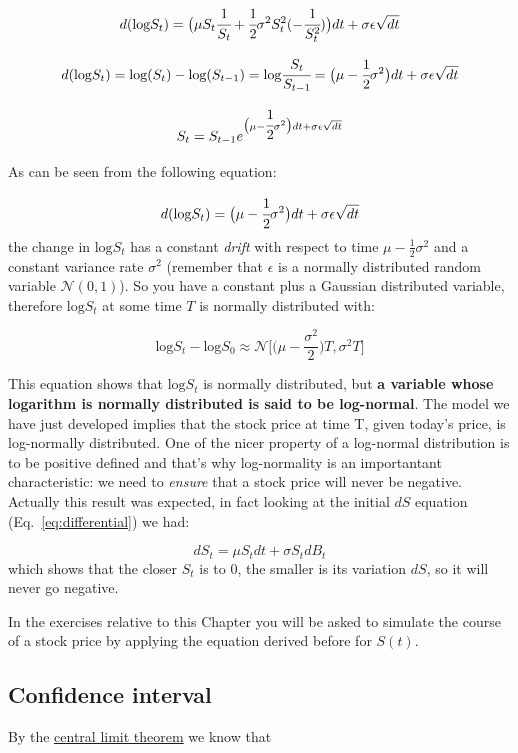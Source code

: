 \[d(\textrm{log} S_t) = \big(\mu S_t \cfrac{1}{S_t} + \cfrac{1}{2}\sigma^2 S_t^2 (-\cfrac{1}{S_t^2})\big)dt + \sigma\epsilon\sqrt{dt}\]

\[d(\textrm{log} S_t) = \textrm{log} (S_t) - \textrm{log} (S_{t-1}) = \textrm{log} \cfrac{S_t}{S_{t-1}} = \big(\mu - \cfrac{1}{2}\sigma^2\big)dt + \sigma\epsilon\sqrt{dt}\]

\[S_t = S_{t-1}e^{\big(\mu - \cfrac{1}{2}\sigma^2\big)dt + \sigma\epsilon\sqrt{dt}}\]

    As can be seen from the following equation:

\[d(\textrm{log} S_t) = \big(\mu - \cfrac{1}{2}\sigma^2\big)dt + \sigma\epsilon\sqrt{dt}\]
the change in \(\textrm{log} S_t\) has a constant \emph{drift} with respect to time 
\(\mu - \frac{1}{2}\sigma^2\) and a constant variance rate \(\sigma^2\)
(remember that \(\epsilon\) is a normally distributed random variable
\(\mathcal{N}(0,1)\)). So you have a constant plus a Gaussian
distributed variable, therefore \(\textrm{log} S_t\) at some time \(T\)
is normally distributed with:

\[\textrm{log}S_t - \textrm{log}S_0 \approx\mathcal{N}\big[\big(\mu-\frac{\sigma^2}{2}\big)T, \sigma^2 T\big]\]

This equation shows that \(\textrm{log}S_t\) is normally distributed,
but \textbf{a variable whose logarithm is normally distributed is said
to be log-normal}. The model we have just developed implies that
the stock price at time T, given today's price, is log-normally
distributed. One of the nicer property of a log-normal distribution is to be positive defined and that's why log-normality is an importantant characteristic: we need to \emph{ensure} that a stock price will never be negative. Actually this result was expected, in fact looking at the initial \(dS\) equation (Eq.~\ref{eq:differential}) we had:

\[dS_t = \mu S_tdt + \sigma S_tdB_t\]
which shows that the closer \(S_t\) is to 0, the smaller is its variation \(dS\), so it will never go negative.

In the exercises relative to this Chapter you will be asked to simulate the course of a stock price by applying the equation derived before for $S(t)$.

\subsection{Confidence interval}\label{confidence-interval}

By the \href{https://en.wikipedia.org/wiki/Central_limit_theorem}{central limit theorem} we know that 

